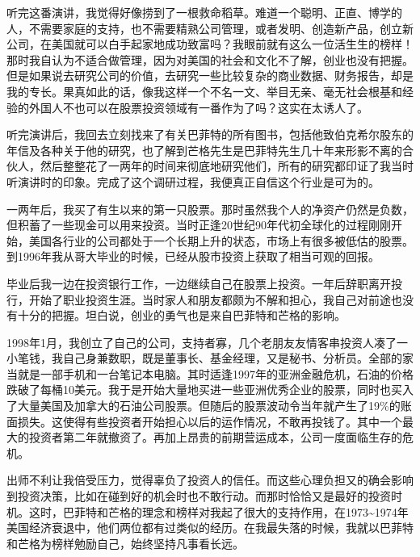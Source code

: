 听完这番演讲，我觉得好像捞到了一根救命稻草。难道一个聪明、正直、博学的人，不需要家庭的支持，也不需要精熟公司管理，或者发明、创造新产品，创立新公司，在美国就可以白手起家地成功致富吗？我眼前就有这么一位活生生的榜样！那时我自认为不适合做管理，因为对美国的社会和文化不了解，创业也没有把握。但是如果说去研究公司的价值，去研究一些比较复杂的商业数据、财务报告，却是我的专长。果真如此的话，像我这样一个不名一文、举目无亲、毫无社会根基和经验的外国人不也可以在股票投资领域有一番作为了吗？这实在太诱人了。
\par

听完演讲后，我回去立刻找来了有关巴菲特的所有图书，包括他致伯克希尔股东的年信及各种关于他的研究，也了解到芒格先生是巴菲特先生几十年来形影不离的合伙人，然后整整花了一两年的时间来彻底地研究他们，所有的研究都印证了我当时听演讲时的印象。完成了这个调研过程，我便真正自信这个行业是可为的。
\par

一两年后，我买了有生以来的第一只股票。那时虽然我个人的净资产仍然是负数，但积蓄了一些现金可以用来投资。当时正逢20世纪90年代初全球化的过程刚刚开始，美国各行业的公司都处于一个长期上升的状态，市场上有很多被低估的股票。到1996年我从哥大毕业的时候，已经从股市投资上获取了相当可观的回报。
\par

毕业后我一边在投资银行工作，一边继续自己在股票上投资。一年后辞职离开投行，开始了职业投资生涯。当时家人和朋友都颇为不解和担心，我自己对前途也没有十分的把握。坦白说，创业的勇气也是来自巴菲特和芒格的影响。
\par

1998年1月，我创立了自己的公司，支持者寡，几个老朋友友情客串投资人凑了一小笔钱，我自己身兼数职，既是董事长、基金经理，又是秘书、分析员。全部的家当就是一部手机和一台笔记本电脑。其时适逢1997年的亚洲金融危机，石油的价格跌破了每桶10美元。我于是开始大量地买进一些亚洲优秀企业的股票，同时也买入了大量美国及加拿大的石油公司股票。但随后的股票波动令当年就产生了19\%的账面损失。这使得有些投资者开始担心以后的运作情况，不敢再投钱了。其中一个最大的投资者第二年就撤资了。再加上昂贵的前期营运成本，公司一度面临生存的危机。
\par

出师不利让我倍受压力，觉得辜负了投资人的信任。而这些心理负担又的确会影响到投资决策，比如在碰到好的机会时也不敢行动。而那时恰恰又是最好的投资时机。这时，巴菲特和芒格的理念和榜样对我起了很大的支持作用，在1973\textasciitilde{}1974年美国经济衰退中，他们两位都有过类似的经历。在我最失落的时候，我就以巴菲特和芒格为榜样勉励自己，始终坚持凡事看长远。
\par


